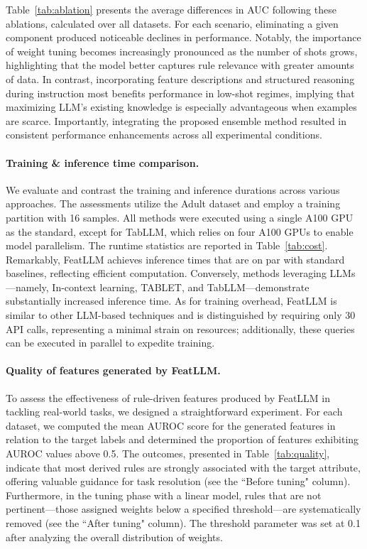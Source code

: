 Table~\ref{tab:ablation} presents the average differences in AUC following these ablations, calculated over all datasets. For each scenario, eliminating a given component produced noticeable declines in performance. Notably, the importance of weight tuning becomes increasingly pronounced as the number of shots grows, highlighting that the model better captures rule relevance with greater amounts of data. In contrast, incorporating feature descriptions and structured reasoning during instruction most benefits performance in low-shot regimes, implying that maximizing LLM’s existing knowledge is especially advantageous when examples are scarce. Importantly, integrating the proposed ensemble method resulted in consistent performance enhancements across all experimental conditions.

\vspace*{-0.12in}
\paragraph{Training \& inference time comparison.} We evaluate and contrast the training and inference durations across various approaches. The assessments utilize the Adult dataset and employ a training partition with 16 samples. All methods were executed using a single A100 GPU as the standard, except for TabLLM, which relies on four A100 GPUs to enable model parallelism. The runtime statistics are reported in Table~\ref{tab:cost}. Remarkably, \textsf{FeatLLM} achieves inference times that are on par with standard baselines, reflecting efficient computation. Conversely, methods leveraging LLMs—namely, In-context learning, TABLET, and TabLLM—demonstrate substantially increased inference time. As for training overhead, \textsf{FeatLLM} is similar to other LLM-based techniques and is distinguished by requiring only 30 API calls, representing a minimal strain on resources; additionally, these queries can be executed in parallel to expedite training.

\vspace*{-0.12in}
\paragraph{Quality of features generated by \textsf{FeatLLM}.}
To assess the effectiveness of rule-driven features produced by \textsf{FeatLLM} in tackling real-world tasks, we designed a straightforward experiment. For each dataset, we computed the mean AUROC score for the generated features in relation to the target labels and determined the proportion of features exhibiting AUROC values above 0.5. The outcomes, presented in Table~\ref{tab:quality}, indicate that most derived rules are strongly associated with the target attribute, offering valuable guidance for task resolution (see the ``Before tuning" column). Furthermore, in the tuning phase with a linear model, rules that are not pertinent—those assigned weights below a specified threshold—are systematically removed (see the ``After tuning" column). The threshold parameter was set at 0.1 after analyzing the overall distribution of weights.

